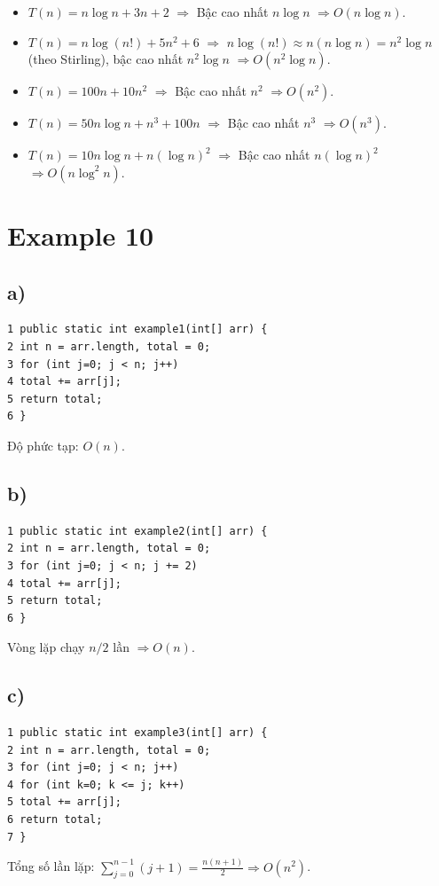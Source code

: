\documentclass[12pt,a4paper]{article}
\begin{document}
\begin{itemize}
    \item[(a)] $T(n) = n\log n + 3n + 2$ $\Rightarrow$ Bậc cao nhất $n\log n$ $\Rightarrow O(n\log n)$.
    \item[(b)] $T(n) = n\log(n!) + 5n^2 + 6$ $\Rightarrow$ $n\log(n!) \approx n(n\log n) = n^2\log n$ (theo Stirling), bậc cao nhất $n^2\log n$ $\Rightarrow O(n^2\log n)$.
    \item[(c)] $T(n) = 100n + 10n^2$ $\Rightarrow$ Bậc cao nhất $n^2$ $\Rightarrow O(n^2)$.
    \item[(d)] $T(n) = 50n\log n + n^3 + 100n$ $\Rightarrow$ Bậc cao nhất $n^3$ $\Rightarrow O(n^3)$.
    \item[(e)] $T(n) = 10n\log n + n(\log n)^2$ $\Rightarrow$ Bậc cao nhất $n(\log n)^2$ $\Rightarrow O(n \log^2 n)$.
\end{itemize}

\section*{Example 10}

\subsection*{a)}
\begin{verbatim}
1 public static int example1(int[] arr) {
2 int n = arr.length, total = 0;
3 for (int j=0; j < n; j++)
4 total += arr[j];
5 return total;
6 }
\end{verbatim}
Độ phức tạp: $O(n)$.

\subsection*{b)}
\begin{verbatim}
1 public static int example2(int[] arr) {
2 int n = arr.length, total = 0;
3 for (int j=0; j < n; j += 2)
4 total += arr[j];
5 return total;
6 }
\end{verbatim}
Vòng lặp chạy $n/2$ lần $\Rightarrow O(n)$.

\subsection*{c)}
\begin{verbatim}
1 public static int example3(int[] arr) {
2 int n = arr.length, total = 0;
3 for (int j=0; j < n; j++)
4 for (int k=0; k <= j; k++)
5 total += arr[j];
6 return total;
7 }
\end{verbatim}
Tổng số lần lặp: $\sum_{j=0}^{n-1} (j+1) = \frac{n(n+1)}{2} \Rightarrow O(n^2)$.
\end{document}
